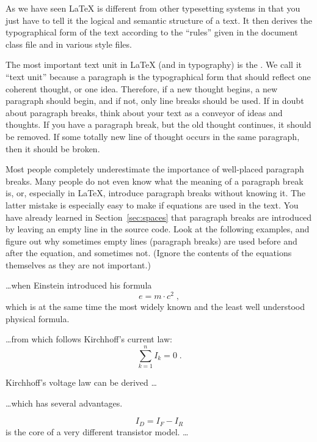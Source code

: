 As we have seen \LaTeX{} is different from other typesetting systems in that
you just have to tell it the logical and semantic structure of a text.  It then
derives the typographical form of the text according to the \enquote{rules}
given in the document class file and in various style files.

The most important text unit in \LaTeX{} (and in typography) is the
.  We call it \enquote{text unit} because a paragraph is the
typographical form that should reflect one coherent thought, or one idea.
Therefore, if a new thought begins, a new paragraph should begin, and if not,
only line breaks should be used.  If in doubt about paragraph breaks, think
about your text as a conveyor of ideas and thoughts.  If you have a paragraph
break, but the old thought continues, it should be removed.  If some totally
new line of thought occurs in the same paragraph, then it should be broken.

Most people completely underestimate the importance of well-placed paragraph
breaks. Many people do not even know what the meaning of a paragraph break is,
or, especially in \LaTeX, introduce paragraph breaks without knowing it.  The
latter mistake is especially easy to make if equations are used in the text.
You have already learned in Section~\ref{sec:spaces} that paragraph breaks are
introduced by leaving an empty line in the source code. Look at the following
examples, and figure out why sometimes empty lines (paragraph breaks) are used
before and after the equation, and sometimes not. (Ignore the contents of the
equations themselves as they are not important.)

\begin{example}[standalone, paperwidth=5cm, paperheight=4cm]
\ldots when Einstein introduced
his formula
\begin{equation}
  e = m \cdot c^2 \; ,
\end{equation}
which is at the same time the
most widely known and the least
well understood physical formula.
\end{example}
\begin{example}[standalone, paperwidth=5cm, paperheight=4cm]
\ldots from which follows
Kirchhoff's current law:
\begin{equation}
  \sum_{k=1}^{n} I_k = 0 \; .
\end{equation}

Kirchhoff's voltage law can
be derived \ldots
\end{example}
\begin{example}[standalone, paperwidth=5cm, paperheight=4cm]
\ldots which has several
advantages.

\begin{equation}
  I_D = I_F - I_R
\end{equation}
is the core of a very different
transistor model. \ldots
\end{example}

